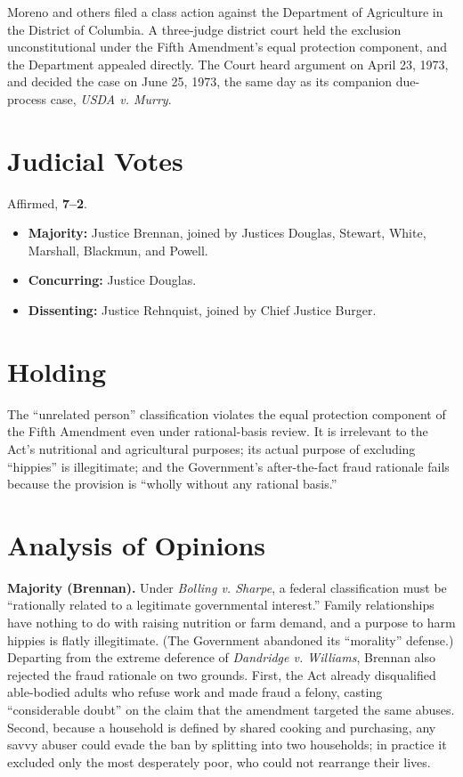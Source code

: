 \documentclass[12pt]{article}
\begin{document}
Moreno and others filed a class action against the Department of Agriculture in the District of Columbia. A three-judge district court held the exclusion unconstitutional under the Fifth Amendment's equal protection component, and the Department appealed directly. The Court heard argument on April 23, 1973, and decided the case on June 25, 1973, the same day as its companion due-process case, \textit{USDA v. Murry}.

\section{Judicial Votes}

Affirmed, \textbf{7--2}.
\begin{itemize}
\item \textbf{Majority:} Justice Brennan, joined by Justices Douglas, Stewart, White, Marshall, Blackmun, and Powell.
\item \textbf{Concurring:} Justice Douglas.
\item \textbf{Dissenting:} Justice Rehnquist, joined by Chief Justice Burger.
\end{itemize}

\section{Holding}

The ``unrelated person'' classification violates the equal protection component of the Fifth Amendment even under rational-basis review. It is irrelevant to the Act's nutritional and agricultural purposes; its actual purpose of excluding ``hippies'' is illegitimate; and the Government's after-the-fact fraud rationale fails because the provision is ``wholly without any rational basis.''

\section{Analysis of Opinions}

\textbf{Majority (Brennan).} Under \textit{Bolling v. Sharpe}, a federal classification must be ``rationally related to a legitimate governmental interest.'' Family relationships have nothing to do with raising nutrition or farm demand, and a purpose to harm hippies is flatly illegitimate. (The Government abandoned its ``morality'' defense.) Departing from the extreme deference of \textit{Dandridge v. Williams}, Brennan also rejected the fraud rationale on two grounds. First, the Act already disqualified able-bodied adults who refuse work and made fraud a felony, casting ``considerable doubt'' on the claim that the amendment targeted the same abuses. Second, because a household is defined by shared cooking and purchasing, any savvy abuser could evade the ban by splitting into two households; in practice it excluded only the most desperately poor, who could not rearrange their lives.
\end{document}
